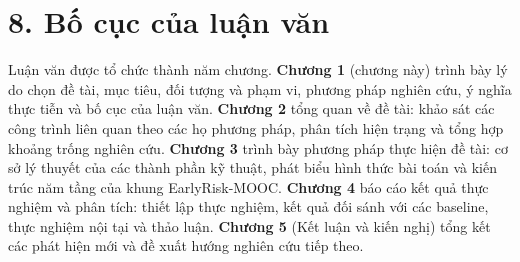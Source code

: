 \section*{8. Bố cục của luận văn}

Luận văn được tổ chức thành năm chương. \textbf{Chương 1} (chương này) trình bày lý do chọn đề tài, mục tiêu, đối tượng và phạm vi, phương pháp nghiên cứu, ý nghĩa thực tiễn và bố cục của luận văn. \textbf{Chương 2} tổng quan về đề tài: khảo sát các công trình liên quan theo các họ phương pháp, phân tích hiện trạng và tổng hợp khoảng trống nghiên cứu. \textbf{Chương 3} trình bày phương pháp thực hiện đề tài: cơ sở lý thuyết của các thành phần kỹ thuật, phát biểu hình thức bài toán và kiến trúc năm tầng của khung EarlyRisk-MOOC. \textbf{Chương 4} báo cáo kết quả thực nghiệm và phân tích: thiết lập thực nghiệm, kết quả đối sánh với các baseline, thực nghiệm nội tại và thảo luận. \textbf{Chương 5} (Kết luận và kiến nghị) tổng kết các phát hiện mới và đề xuất hướng nghiên cứu tiếp theo.

\clearpage
